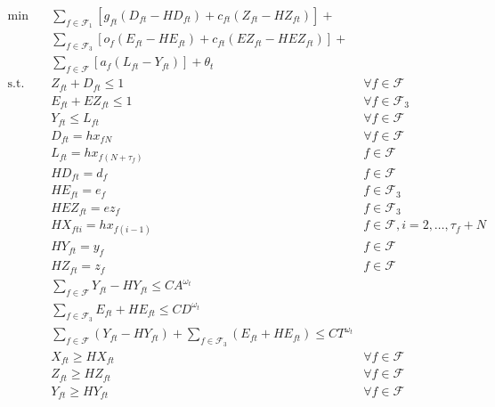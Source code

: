 \documentclass[12pt]{article}
\begin{document}
	\begin{subequations}
		\begin{align}
			\min \quad & \sum_{f \in \mathcal{F}_1} \left[ g_{ft} (D_{ft} - HD_{ft}) + c_{ft} (Z_{ft} - HZ_{ft}) \right]  + & \nonumber \\
			& \sum_{f \in \mathcal{F}_3} \left[ o_f(E_{ft} - HE_{ft}) + c_{ft}(EZ_{ft} - HEZ_{ft}) \right] + & \nonumber\\ 
			& \sum_{f \in \mathcal{F}} \left[ a_f (L_{ft} - Y_{ft})\right]  + \theta_t &\\
			\text{s.t.} \quad & Z_{ft} + D_{ft} \leq 1 & \forall f \in \mathcal{F} \label{cons:cancelORTOtr}\\
			& E_{ft} + EZ_{ft} \leq 1 & \forall f \in \mathcal{F}_3 \label{cons:cancelTO2tr}\\
			& Y_{ft} \leq L_{ft} & \forall f \in \mathcal{F} \label{cons:arrlandtr}\\
			& D_{ft} = hx_{fN} & \forall f \in \mathcal{F} \label{cons:TOHisttr1}\\
			& L_{ft} = hx_{f(N+\tau_{f})}& f \in \mathcal{F} \label{cons:landHisttr}\\
			& HD_{ft} = d_{f} & f \in \mathcal{F} \label{cons:TOHisttr2}\\
			& HE_{ft} = e_{f} & f \in \mathcal{F}_3 \label{cons:TO2Histtr}\\
			& HEZ_{ft} = ez_{f} & f \in \mathcal{F}_3 \label{cons:cancelTO2Histtr}\\
			& HX_{fti} = hx_{f(i-1)} & f \in \mathcal{F}, i = 2, \dots, \tau_{f} + N \label{cons:planHisttr}\\
			& HY_{ft} = y_{f} & f \in \mathcal{F} \label{cons:arrHisttr}\\
			& HZ_{ft} = z_{f} & f \in \mathcal{F} \label{cons:cancelHisttr}\\
			& \sum_{f \in \mathcal{F}} Y_{ft} - HY_{ft} \leq CA^{\omega_t} & \label{cons:arrCaptr}\\
			& \sum_{f \in \mathcal{F}_3} E_{ft} + HE_{ft} \leq CD^{\omega_t} &\label{cons:deptCaptr}\\
			& \sum_{f \in \mathcal{F}} (Y_{ft} - HY_{ft}) + \sum_{f \in \mathcal{F}_3} (E_{ft} + HE_{ft}) \leq CT^{\omega_t} & \label{cons:totCaptr}\\
			& X_{ft} \geq HX_{ft} & \forall f \in \mathcal{F} \label{cons:transXtr}\\
			& Z_{ft} \geq HZ_{ft} & \forall f \in \mathcal{F} \label{cons:transZtr}\\
			& Y_{ft} \geq HY_{ft} & \forall f \in \mathcal{F} \label{cons:transYtr}\\

\end{align}
\end{subequations}
\end{document}
